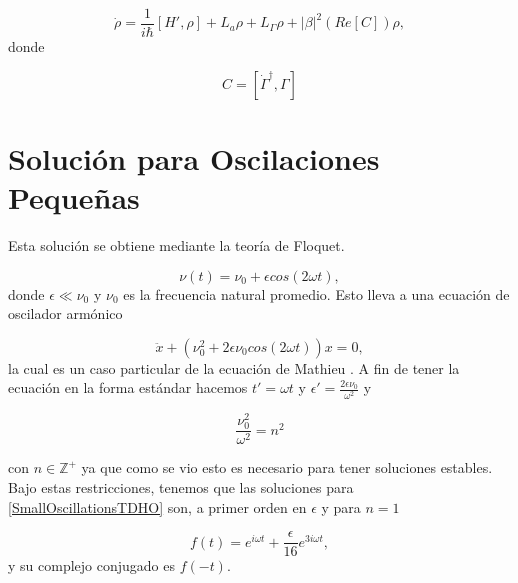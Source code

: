 \documentclass[10pt,a4paper]{report}
\begin{document}
\begin{equation}\label{DLCMasterEquation}
\dot{\rho} = \frac{1}{i\hbar}[H',\rho] + L_a\rho + L_\Gamma\rho + |\beta|^2(Re[C])\rho,
\end{equation} donde 

\begin{equation}
C = [\dot{\Gamma}^\dagger, \Gamma]
\end{equation} 



\section{Solución para Oscilaciones Pequeñas}
Esta solución se obtiene mediante la teoría de Floquet. \cite{TesisMaestria} 

\begin{equation}\label{SmallOscillationsTDHO}
\nu(t) = \nu_0 + \epsilon cos(2\omega t),
\end{equation} donde $\epsilon \ll \nu_0$ y $\nu_0$ es la frecuencia natural promedio. Esto lleva a una ecuación de oscilador armónico

\begin{equation}
\ddot{x} + (\nu_0^2 + 2\epsilon \nu_0 cos(2\omega t))x = 0,
\end{equation} la cual es un caso particular de la ecuación de Mathieu \cite{PiatekME}. A fin de tener la ecuación en la forma estándar hacemos $t'= \omega t$ y $\epsilon' = \frac{2\epsilon \nu_0}{\omega^2}$ y


\begin{equation}
\frac{\nu_0^2}{\omega^2} = n^2\label{scattering}
\end{equation}

con $n \in \mathbb{Z}^+$ ya que como se vio esto es necesario para tener soluciones estables\cite{WardFT}. Bajo estas restricciones, tenemos que las soluciones para \eqref{SmallOscillationsTDHO} son, a primer orden en $\epsilon$ y para $n=1$

\begin{equation}\label{SmallOscillationsSolution}
f(t)=  e^{i\omega t} + \frac{\epsilon}{16} e^{3i\omega t},
\end{equation} y su complejo conjugado es $f(-t)$.
\end{document}
